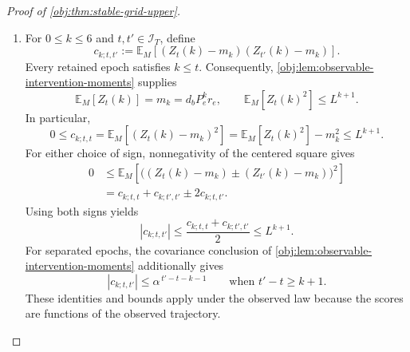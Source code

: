 \begin{proof}[Proof of \cref{obj:thm:stable-grid-upper}]
\begin{enumerate}
\item For \(0\le k\le6\) and \(t,t'\in\mathcal I_T\), define
\[
c_{k;t,t'}
:=
\mathbb E_M\!\left[
  (Z_t(k)-m_k)(Z_{t'}(k)-m_k)
\right].
\]
Every retained epoch satisfies \(k\le t\). Consequently, \cref{obj:lem:observable-intervention-moments} supplies
\[
\mathbb E_M[Z_t(k)]=m_k=d_bP_e^kr_e,
\qquad
\mathbb E_M[Z_t(k)^2]\le L^{k+1}.
\]
In particular,
\[
0\le c_{k;t,t}
=
\mathbb E_M[(Z_t(k)-m_k)^2]
=
\mathbb E_M[Z_t(k)^2]-m_k^2
\le L^{k+1}.
\]
For either choice of sign, nonnegativity of the centered square gives
\[
\begin{aligned}
0
&\le
\mathbb E_M\!\left[
 \bigl((Z_t(k)-m_k)\pm(Z_{t'}(k)-m_k)\bigr)^2
\right]\\
&=
c_{k;t,t}+c_{k;t',t'}\pm2c_{k;t,t'}.
\end{aligned}
\]
Using both signs yields
\[
|c_{k;t,t'}|
\le
\frac{c_{k;t,t}+c_{k;t',t'}}2
\le L^{k+1}.
\]
For separated epochs, the covariance conclusion of
\cref{obj:lem:observable-intervention-moments} additionally gives
\[
|c_{k;t,t'}|
\le\alpha^{\,t'-t-k-1}
\qquad\text{when }t'-t\ge k+1.
\]
These identities and bounds apply under the observed law because the scores are functions of the observed trajectory.


\end{enumerate}
\end{proof}
